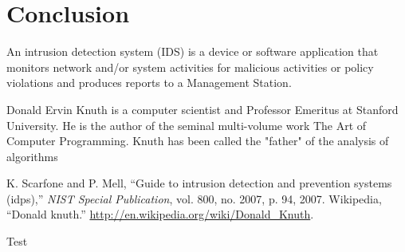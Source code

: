 \documentclass{fisatprojectfinal}
\begin{document}
\chapter{Conclusion}

An intrusion detection system (IDS) \cite{nist} is a device or software application that monitors network and/or system activities for malicious activities or policy violations and produces reports to a Management Station.


Donald Ervin Knuth \cite{knuth} is a computer scientist and Professor Emeritus at Stanford University. He is the author of the seminal multi-volume work The Art of Computer Programming. Knuth has been called the "father" of the analysis of algorithms


\begin{thebibliography}{1}
 K. Scarfone and P. Mell, ``Guide to intrusion detection and prevention systems
(idps),'' \textit{NIST Special Publication}, vol. 800, no. 2007, p. 94, 2007.
 Wikipedia, ``Donald knuth.'' \url{http://en.wikipedia.org/wiki/Donald_Knuth}.
\end{thebibliography}

\begin{appendices}
Test
\end{appendices}
\end{document}
